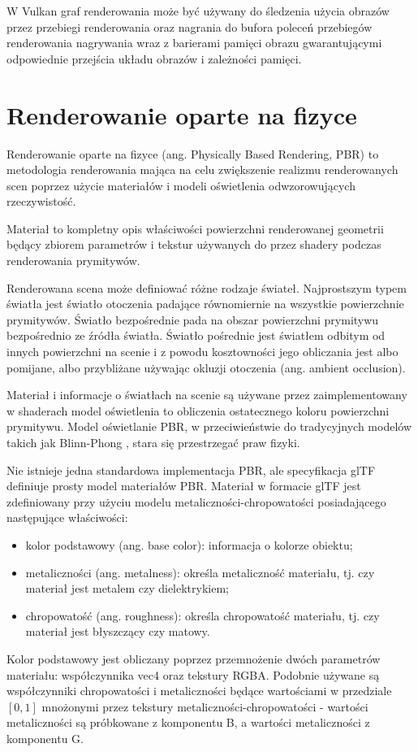 W Vulkan graf renderowania może być używany do śledzenia użycia obrazów przez przebiegi renderowania oraz nagrania do bufora poleceń przebiegów renderowania nagrywania wraz z barierami pamięci obrazu gwarantującymi odpowiednie przejścia układu obrazów i zależności pamięci.



\section{Renderowanie oparte na fizyce}

Renderowanie oparte na fizyce (ang. Physically Based Rendering, PBR) to metodologia renderowania mająca na celu zwiększenie realizmu renderowanych scen poprzez użycie materiałów i modeli oświetlenia odwzorowujących rzeczywistość.
 
Materiał to kompletny opis właściwości powierzchni renderowanej geometrii będący zbiorem parametrów i tekstur używanych do przez shadery podczas renderowania prymitywów.

Renderowana scena może definiować różne rodzaje świateł.
Najprostszym typem światła jest światło otoczenia padające równomiernie na wszystkie powierzchnie prymitywów.
Światło bezpośrednie pada na obszar powierzchni prymitywu bezpośrednio ze źródła światła.
Światło pośrednie jest światłem odbitym od innych powierzchni na scenie i z powodu kosztowności jego obliczania jest albo pomijane, albo przybliżane używając okluzji otoczenia (ang. ambient occlusion).

Materiał i informacje o światłach na scenie są używane przez zaimplementowany w shaderach model oświetlenia to obliczenia ostatecznego koloru powierzchni prymitywu.
Model oświetlanie PBR, w przeciwieństwie do tradycyjnych modelów takich jak Blinn-Phong \cite{HughesDamEtAl13}, stara się przestrzegać praw fizyki.

Nie istnieje jedna standardowa implementacja PBR, ale specyfikacja glTF \cite{GLTFSPEC} definiuje prosty model materiałów PBR.
Materiał w formacie glTF jest zdefiniowany przy użyciu modelu metaliczności-chropowatości posiadającego następujące właściwości:
\begin{itemize}
	\item kolor podstawowy (ang. base color): informacja o kolorze obiektu;
	\item metaliczności (ang. metalness): określa metaliczność materiału, tj. czy materiał jest metalem czy dielektrykiem;
	\item chropowatość (ang. roughness): określa chropowatość materiału, tj. czy materiał jest błyszczący czy matowy.
\end{itemize}
Kolor podstawowy jest obliczany poprzez przemnożenie dwóch parametrów materiału: współczynnika vec4 oraz tekstury RGBA.
Podobnie używane są współczynniki chropowatości i metaliczności będące wartościami w przedziale $\left[0,1\right]$ mnożonymi przez tekstury metaliczności-chropowatości - wartości metaliczności są próbkowane z komponentu B, a wartości metaliczności z komponentu G.

